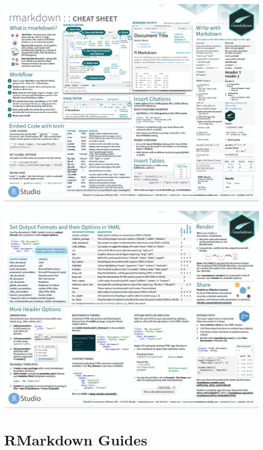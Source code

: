 \documentclass[
]{book}
\theoremstyle{definition}
\theoremstyle{definition}
\theoremstyle{definition}
\theoremstyle{definition}
\theoremstyle{remark}
\begin{document}
\begin{center}\includegraphics{Figures/RmarkdownCheatSheet1} \end{center}

\begin{center}\includegraphics{Figures/RmarkdownCheatSheet2} \end{center}

\hypertarget{rmarkdown-guides}{%
\section*{RMarkdown Guides}\label{rmarkdown-guides}}
\end{document}
